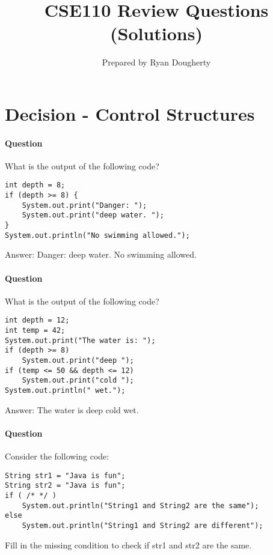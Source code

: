 \documentclass{article}
\title{CSE110 Review Questions (Solutions)}
\author{Prepared by Ryan Dougherty}
\date{}
\begin{document}
\maketitle

\section*{Decision - Control Structures}


\setcounter{question_num}{1}
\paragraph{Question }
What is the output of the following code?
\begin{lstlisting}
int depth = 8;
if (depth >= 8) {
	System.out.print("Danger: ");
	System.out.print("deep water. ");
}
System.out.println("No swimming allowed.");
\end{lstlisting}
{\color{red}Answer: Danger: deep water. No swimming allowed.}

\addtocounter{question_num}{1}
\paragraph{Question }
What is the output of the following code?
\begin{lstlisting}
int depth = 12;
int temp = 42;
System.out.print("The water is: ");
if (depth >= 8)
	System.out.print("deep ");
if (temp <= 50 && depth <= 12)
	System.out.print("cold ");
System.out.println(" wet.");
\end{lstlisting}
{\color{red}Answer: The water is deep cold wet.}

\addtocounter{question_num}{1}
\paragraph{Question }
Consider the following code:
\begin{lstlisting}
String str1 = "Java is fun";
String str2 = "Java is fun";
if ( /* */ )
	System.out.println("String1 and String2 are the same");
else
	System.out.println("String1 and String2 are different");
\end{lstlisting}
Fill in the missing condition to check if str1 and str2 are the same.
\end{document}

